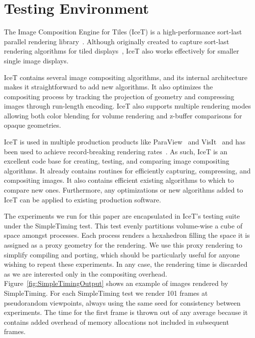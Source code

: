 \documentclass{acm_proc_article-sp}
\newcommand*{\lcite}[1]{~\cite{#1}}
\begin{document}
\section{Testing Environment}
\label{sec:TestingEnvironment}

The Image Composition Engine for Tiles (IceT) is a high-performance
sort-last parallel rendering library\lcite{IceT}.  Although originally
created to capture sort-last rendering algorithms for tiled
displays\lcite{Moreland2001}, IceT also works effectively for smaller
single image displays.

IceT contains several image compositing algorithms, and its internal
architecture makes it straightforward to add new algorithms.  It also
optimizes the compositing process by tracking the projection of geometry
and compressing images through run-length encoding.  IceT also supports
multiple rendering modes allowing both color blending for volume rendering
and z-buffer comparisons for opaque geometries.

IceT is used in multiple production products like ParaView\lcite{ParaView}
and VisIt\lcite{VisIt} and has been used to achieve record-breaking
rendering rates\lcite{Higham2005}.  As such, IceT is an excellent code base
for creating, testing, and comparing image compositing algorithms.  It
already contains routines for efficiently capturing, compressing, and
compositing images.  It also contains efficient existing algorithms to
which to compare new ones.  Furthermore, any optimizations or new
algorithms added to IceT can be applied to existing production software.

The experiments we run for this paper are encapsulated in IceT's testing
suite under the SimpleTiming test.  This test evenly partitions volume-wise
a cube of space amongst processes.  Each process renders a hexahedron
filling the space it is assigned as a proxy geometry for the rendering.  We
use this proxy rendering to simplify compiling and porting, which should be
particularly useful for anyone wishing to repeat these experiments.  In any
case, the rendering time is discarded as we are interested only in the
compositing overhead.  Figure~\ref{fig:SimpleTimingOutput} shows an example
of images rendered by SimpleTiming.  For each SimpleTiming test we render
101 frames at pseudorandom viewpoints, always using the same seed for
consistency between experiments.  The time for the first frame is thrown
out of any average because it contains added overhead of memory allocations
not included in subsequent frames.
\end{document}
